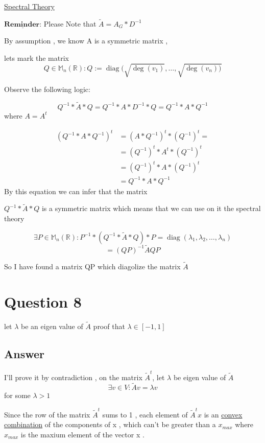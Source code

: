 \documentclass[9pt,twocolumn]{article}
\DeclareMathOperator{\diag}{diag}
\begin{document}
\href{https://en.wikipedia.org/wiki/Spectral\_theory}{Spectral Theory}

\begin{math}
\underline{\textbf{Reminder:}}
\end{math}
Please Note that \(\tilde{A}=A_G*D^{-1}\)

By assumption , we know A is a symmetric matrix ,

lets mark the matrix
\[ Q\in \mathbb{M}_n(\mathbb{R}) : Q := \diag(\sqrt{ \deg(v_1) },\dots , \sqrt{ \deg(v_n)) } \]

Observe the following logic:

\[
Q^{-1}*\tilde{A}*Q=Q^{-1}*A*D^{-1}*Q=Q^{-1}*A*Q^{-1}
\]
where \(A=A^{t}\)

\begin{align*}
(Q^{-1}*A*Q^{-1})^{t}&=(A*Q^{-1})^t*(Q^{-1})^t= \\
                    &=(Q^{-1})^t*A^t*(Q^{-1})^t \\
                    &=(Q^{-1})^t*A*(Q^{-1})^t \\
                    &=Q^{-1}*A*Q^{-1}
\end{align*}
By this equation we can infer that the matrix

\(Q^{-1}*\tilde{A}*Q\) is
a symmetric matrix which means that we can use on it the spectral theory

\[
\exists P\in \mathbb{M}_n(\mathbb{R}) : P^{-1}*(Q^{-1}*\tilde{A}*Q)*P = \diag(\lambda _1 , \lambda _2 , \dots , \lambda _n)
\]
\[
=(QP)^{-1}\tilde{A}QP
\]

So I have found a matrix QP which diagolize the matrix \(\tilde{A}\)





\section*{Question 8}
\label{sec:org0c65aa3}

let \(\lambda\) be an eigen value of \(\tilde{A}\) proof that
\(\lambda\in [-1,1]\)

\subsection*{Answer}
\label{sec:org7e314fe}
I'll prove it by contradiction , on the matrix \(\tilde{A}^t\), let \(\lambda\) be eigen value of \(\tilde{A}\)
\[\exists v\in V : \tilde{A}v=\lambda v\]
for some \(\lambda > 1\)

Since the row of the matrix \(\tilde{A}^t\) sums to 1 , each element of \(\tilde{A}^tx\) is an
\href{https://en.wikipedia.org/wiki/Convex\_combination}{convex combination} of the components of x , which can't be greater than a \(x_{max}\) where \(x_{max}\) is the maxium
element of the vector x .
\end{document}
